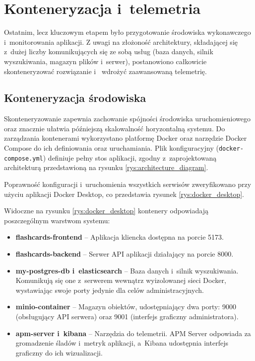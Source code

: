 \section{Konteneryzacja i~telemetria}

Ostatnim, lecz kluczowym etapem było przygotowanie środowiska wykonawczego i~monitorowania aplikacji. 
Z uwagi na złożoność architektury, składającej się z~dużej liczby komunikujących się ze sobą usług 
(baza danych, silnik wyszukiwania, magazyn plików i~serwer), postanowiono całkowicie skonteneryzować rozwiązanie i~
wdrożyć zaawansowaną telemetrię.

\subsection{Konteneryzacja środowiska}
Skonteneryzowanie zapewnia zachowanie spójności środowiska uruchomieniowego oraz znacznie ułatwia późniejszą 
skalowalność horyzontalną systemu. Do zarządzania kontenerami wykorzystano platformę Docker \cite{docker_docs} oraz 
narzędzie Docker Compose do ich definiowania oraz uruchamiania. Plik konfiguracyjny (\texttt{docker-compose.yml}) 
definiuje pełny stos aplikacji, zgodny z~zaprojektowaną architekturą przedstawioną na rysunku \ref{rys:architecture_diagram}.

Poprawność konfiguracji i~uruchomienia wszystkich serwisów zweryfikowano przy użyciu aplikacji Docker Desktop, co 
przedstawia rysunek \ref{rys:docker_desktop}.

Widoczne na rysunku \ref{rys:docker_desktop} kontenery odpowiadają poszczególnym warstwom systemu:
\begin{itemize}
    \item \textbf{flashcards-frontend} -- Aplikacja kliencka dostępna na porcie 5173.
    \item \textbf{flashcards-backend} -- Serwer API aplikacji działający na porcie 8000.
    \item \textbf{my-postgres-db i~elasticsearch} -- Baza danych i~silnik wyszukiwania. Komunikują się one z~serwerem 
    wewnątrz wyizolowanej sieci Docker, wystawiając swoje porty jedynie dla celów administracyjnych.
    \item \textbf{minio-container} -- Magazyn obiektów, udostępniający dwa porty: 9000 (obsługujący API serwera) oraz 
    9001 (interfejs graficzny administratora). 
    \item \textbf{apm-server i~kibana} -- Narzędzia do telemetrii. APM Server odpowiada za gromadzenie śladów i~metryk 
    aplikacji, a~Kibana udostępnia interfejs graficzny do ich wizualizacji.
\end{itemize}

